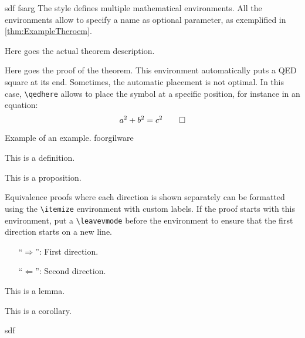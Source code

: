 sdf
fsarg
The style defines multiple mathematical environments. All the environments allow to specify a name as optional parameter, as exemplified in \cref{thm:ExampleTheroem}.
\begin{Thm}
\label{thm:ExampleTheroem}
Here goes the actual theorem description.
\end{Thm}
\begin{Proof}
Here goes the proof of the theorem. This environment automatically puts a QED square at its end. Sometimes, the automatic placement is not optimal. In this case, \texttt{\textbackslash qedhere} allows to place the symbol at a specific position, for instance in an equation:
\[a^2+b^2=c^2\qedhere\]
\end{Proof}
\begin{Exp}Example of an example. foorgilware
\end{Exp}
\begin{Def}This is a definition.
\end{Def}
\begin{Prop}This is a proposition.
\end{Prop}
Equivalence proofs where each direction is shown separately can be formatted using the \texttt{\textbackslash itemize} environment with custom labels. If the proof starts with this environment, put a \texttt{\textbackslash leavevmode} before the environment to ensure that the first direction starts on a new line.
\begin{Proof}\leavevmode
\begin{itemize}[beginpenalty=10000,leftmargin=7ex]
\item[\enquote{$\Rightarrow$}:] First direction.
\item[\enquote{$\Leftarrow$}:] Second direction.\qedhere
\end{itemize}
\end{Proof}

\begin{Lem}This is a lemma.
\end{Lem}
\begin{Cor}This is a corollary.
\end{Cor}

\begin{procedure}
    sdf
\end{procedure}
\begin{problem}
    
\end{problem}